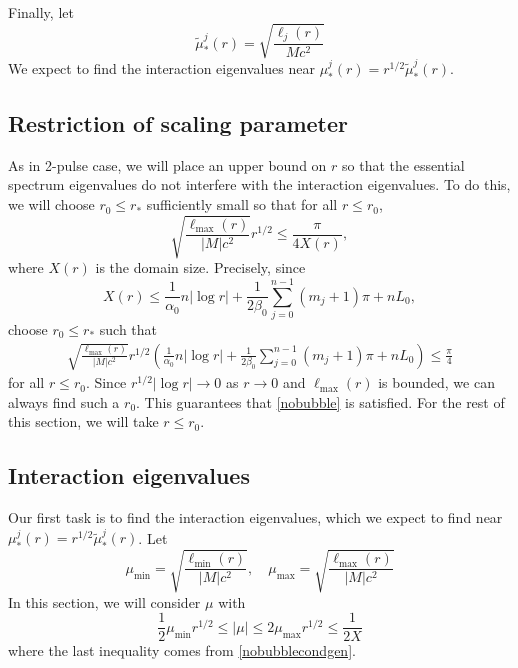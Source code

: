 \documentclass[thesis.tex]{subfiles}
\begin{document}
Finally, let
\[
\tilde{\mu}_*^j(r) = \sqrt{\frac{\ell_j(r)}{M c^2}}
\]
We expect to find the interaction eigenvalues near $\mu_*^j(r) = r^{1/2} \tilde{\mu}_*^j(r)$.

\subsection{Restriction of scaling parameter}

As in 2-pulse case, we will place an upper bound on $r$ so that the essential spectrum eigenvalues do not interfere with the interaction eigenvalues. To do this, we will choose $r_0 \leq r_*$ sufficiently small so that for all $r \leq r_0$,
\begin{equation}\label{nobubble}
\sqrt{\frac{\ell_{\max}(r)}{|M| c^2 }} r^{1/2}  \leq \frac{\pi}{4 X(r)},
\end{equation}
where $X(r)$ is the domain size. Precisely, since
\[
X(r) \leq \frac{1}{\alpha_0} n |\log r| + \frac{1}{2\beta_0} \sum_{j = 0}^{n-1} (m_j + 1)\pi + n L_0, 
\]
choose $r_0 \leq r_*$ such that
\begin{align}\label{nobubblecond}
\sqrt{\frac{\ell_{\max}(r)}{|M|c^2}} r^{1/2} \left( \frac{1}{\alpha_0} n |\log r| + \frac{1}{2\beta_0} \sum_{j = 0}^{n-1} (m_j + 1)\pi + n L_0 \right) \leq \frac{\pi}{4}
\end{align}
for all $r \leq r_0$. Since $r^{1/2}|\log r| \rightarrow 0$ as $r \rightarrow 0$ and $\ell_{\max}(r)$ is bounded, we can always find such a $r_0$. This guarantees that \cref{nobubble} is satisfied. For the rest of this section, we will take $r \leq r_0$. 

\subsection{Interaction eigenvalues}

Our first task is to find the interaction eigenvalues, which we expect to find near $\mu_*^j(r) = r^{1/2} \tilde{\mu}_*^j(r)$. Let
\begin{equation}\label{muminmax}
\mu_{\min} = \sqrt{\frac{\ell_{\min}(r)}{|M| c^2 }}, \quad
\mu_{\max} = \sqrt{\frac{\ell_{\max}(r)}{|M| c^2 }} 
\end{equation}
In this section, we will consider $\mu$ with
\begin{equation}\label{mucondition}
\frac{1}{2} \mu_{\min} r^{1/2} \leq |\mu| \leq 2 \mu_{\max} r^{1/2} \leq \frac{1}{2X}
\end{equation}
where the last inequality comes from \cref{nobubblecondgen}.
\end{document}
